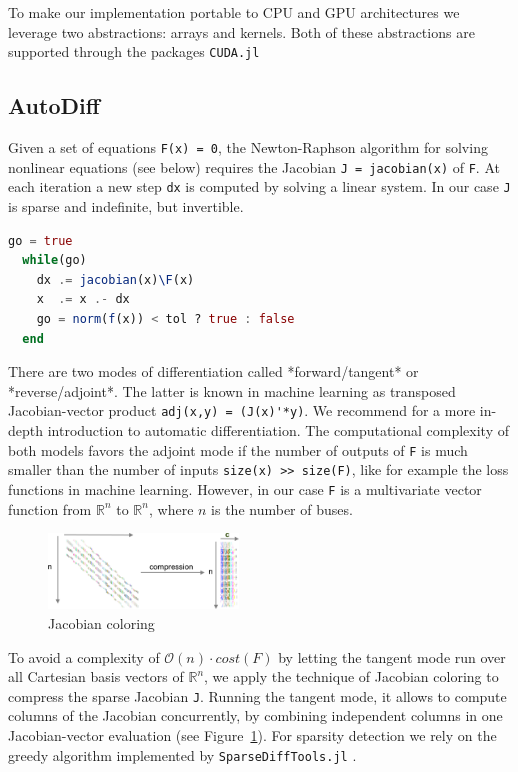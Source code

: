 \documentclass{juliacon}
\newcommand{\reffig}[1]{Figure~\ref{#1}}
\begin{document}
To make our implementation portable to CPU and GPU architectures we leverage
two abstractions: arrays and kernels. Both of these abstractions are
supported through the packages \lstinline{CUDA.jl} \cite{besard2018juliagpu,besard2019prototyping,KernelAbstractions.jl}

\subsection{AutoDiff}

Given a set of equations \lstinline{F(x) = 0}, the Newton-Raphson algorithm for
solving nonlinear equations (see below) requires the Jacobian \lstinline{J = jacobian(x)}
of \lstinline{F}. At each iteration a new step \lstinline{dx} is computed by
solving a linear system. In our case \lstinline{J} is sparse and indefinite, but
invertible.

\begin{lstlisting}[language = Julia]
  go = true
  while(go)
    dx .= jacobian(x)\F(x)
    x  .= x .- dx
    go = norm(f(x)) < tol ? true : false
  end
\end{lstlisting}

There are two modes of differentiation called *forward/tangent* or
*reverse/adjoint*. The latter is known in machine learning as
transposed Jacobian-vector product \lstinline{adj(x,y) = (J(x)'*y)}. We recommend
\cite{griewank2008evaluating} for a more in-depth introduction to automatic
differentiation. The computational complexity of both models favors the
adjoint mode if the number of outputs of \lstinline{F} is much smaller than the
number of inputs \lstinline{size(x) >> size(F)}, like for example the loss functions
in machine learning. However, in our case \lstinline{F} is a multivariate vector
function from $\mathbb{R}^n$ to $\mathbb{R}^n$, where $n$ is the number of
buses.
\newcommand{\bigo}[1]{\mathcal{O}\left( #1 \right)}

\begin{figure}
    \includegraphics[width=0.45\textwidth]{figures/compression.png}
    \caption{Jacobian coloring}
    \label{fig:coloring}
\end{figure}

To avoid a complexity of $\bigo{n} \cdot cost(F)$ by letting the tangent mode
run over all Cartesian basis vectors of $\mathbb{R}^n$, we apply the technique of Jacobian
coloring to compress the sparse Jacobian \lstinline{J}. Running the tangent mode, it
allows to compute columns of the Jacobian concurrently, by combining
independent columns in one Jacobian-vector evaluation (see
\reffig{fig:coloring}). For sparsity detection we rely on the greedy
algorithm implemented by \lstinline{SparseDiffTools.jl} \cite{sparsedifftools}.
\end{document}
